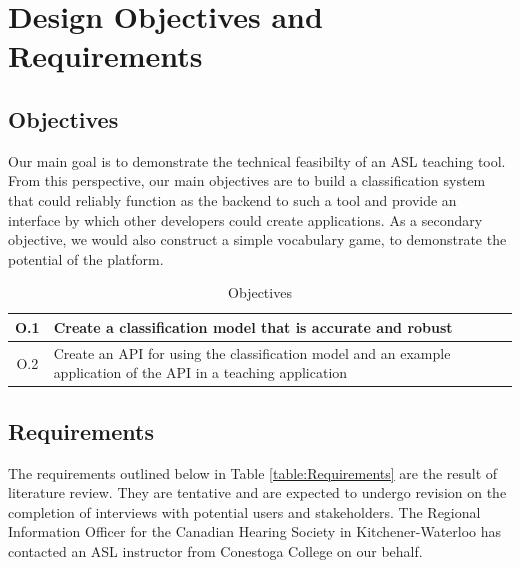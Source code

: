 \documentclass[12pt]{article}
\begin{document}
\newpage
\section{Design Objectives and Requirements}

\subsection{Objectives}
Our main goal is to demonstrate the technical feasibilty of an ASL teaching tool. From this perspective, our main objectives are to build a classification system that could reliably function as the backend to such a tool and provide an interface by which other developers could create applications. As a secondary objective, we would also construct a simple vocabulary game, to demonstrate the potential of the platform.

\begin{table}[H]
\centering
\caption{Objectives}
\label{table:Objectives}
\begin{tabular}{|c| p{14cm} |}
	\hline
	O.1 & Create a classification model that is accurate and robust \\ \hline
	O.2 & Create an API for using the classification model and an example application of the API in a teaching application \\ \hline
\end{tabular}
\end{table}

\subsection{Requirements}
The requirements outlined below in Table \ref{table:Requirements} are the result of literature review. They are tentative and are expected to undergo revision on the completion of interviews with potential users and stakeholders. The Regional Information Officer for the Canadian Hearing Society in Kitchener-Waterloo has contacted an ASL instructor from Conestoga College on our behalf.
\end{document}
